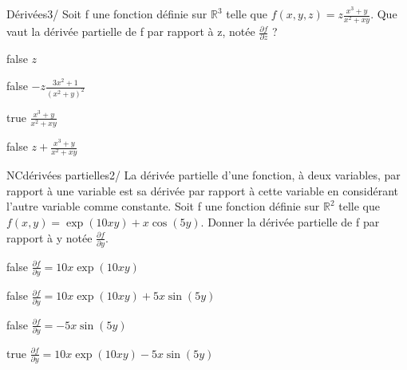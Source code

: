         \begin{question}{22}{Dérivées}{3}{/}
               Soit f une fonction définie sur $\mathbb{R}^{3}$ telle que $f(x,y,z) = z\frac{x^{3}+y}{x^{2}+xy}$. Que vaut la dérivée partielle de f par rapport à z, notée $\frac{\partial f}{\partial z}$ ?
        \end{question}
        \begin{reponses}
        	\item[false]  $z$
        	\item[false]  $-z\frac{3x^{2}+1}{(x^{2}+y)^2}$
            \item[true]  $\frac{x^{3}+y}{x^{2}+xy}$
            \item[false]  $z+\frac{x^{3}+y}{x^{2}+xy}$
        \end{reponses}
            \begin{question}{NC}{dérivées partielles}{2}{/} 
            La dérivée partielle d'une fonction, à deux variables, par rapport à une variable est sa dérivée par rapport à cette variable en considérant l'autre variable comme constante. Soit f une fonction définie sur $\mathbb{R}^{2}$ telle que $f(x,y) = \exp(10xy)+x\cos(5y)$. Donner la dérivée partielle de f par rapport à y notée $\frac{\partial f}{\partial y}$.  
            \end{question}
            \begin{reponses}
            	\item[false]  $\frac{\partial f}{\partial y} = 10x\exp(10xy)$
            	\item[false]  $\frac{\partial f}{\partial y} =10x\exp(10xy)+5x\sin(5y)$
                \item[false]  $\frac{\partial f}{\partial y} =-5x\sin(5y)$
                \item[true]   $\frac{\partial f}{\partial y} =10x\exp(10xy)-5x\sin(5y)$
            \end{reponses}
